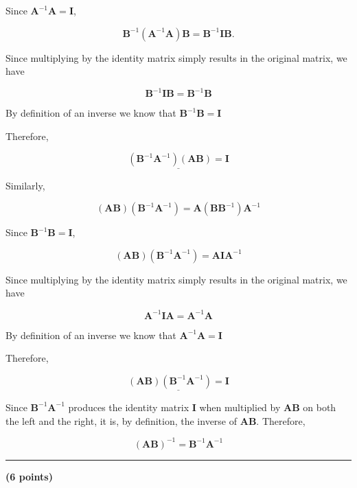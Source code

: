 \documentclass[12pt]{article}
\begin{document}
\begin{enumerate}
\noindent Since $\mathbf{A}^{-1}\mathbf{A} = \mathbf{I}$,

$$
\mathbf{B}^{-1}(\mathbf{A}^{-1}\mathbf{A})\mathbf{B}
=
\mathbf{B}^{-1}\mathbf{I}\mathbf{B}.
$$

\noindent Since multiplying by the identity matrix simply results in the original matrix, we have

$$
\mathbf{B}^{-1}\mathbf{I}\mathbf{B}
=
\mathbf{B}^{-1}\mathbf{B}
$$

By definition of an inverse we know that $\mathbf{B}^{-1}\mathbf{B} = \mathbf{I}$ 

\noindent Therefore,

$$
\underline{
(\mathbf{B}^{-1}\mathbf{A}^{-1})(\mathbf{A}\mathbf{B})=\mathbf{I}
}
$$

\noindent Similarly,

$$
(\mathbf{A}\mathbf{B})(\mathbf{B}^{-1}\mathbf{A}^{-1})
=
\mathbf{A}(\mathbf{B}\mathbf{B}^{-1})\mathbf{A}^{-1}
$$

\noindent Since $\mathbf{B}^{-1}\mathbf{B} = \mathbf{I}$,

$$
(\mathbf{A}\mathbf{B})(\mathbf{B}^{-1}\mathbf{A}^{-1})
=
\mathbf{A}\mathbf{I}\mathbf{A}^{-1}
$$

\noindent Since multiplying by the identity matrix simply results in the original matrix, we have

$$
\mathbf{A}^{-1}\mathbf{I}\mathbf{A}
=
\mathbf{A}^{-1}\mathbf{A}
$$

By definition of an inverse we know that $\mathbf{A}^{-1}\mathbf{A} = \mathbf{I}$ 

\noindent Therefore,

$$
\underline{
(\mathbf{A}\mathbf{B})(\mathbf{B}^{-1}\mathbf{A}^{-1})=\mathbf{I}
}
$$

\noindent Since $\mathbf{B}^{-1}\mathbf{A}^{-1}$ produces the identity matrix $\mathbf{I}$ when multiplied by $\mathbf{A}\mathbf{B}$ on both the left and the right, it is, by definition, the inverse of $\mathbf{A}\mathbf{B}$. Therefore,

$$
\boxed{
(\mathbf{A}\mathbf{B})^{-1}=\mathbf{B}^{-1}\mathbf{A}^{-1}
}
$$

\end{enumerate}

\vspace{2em}

\noindent\rule{\textwidth}{0.4pt}

\vspace{2em}

 \hfill {\large \textbf{(6 points)}}
\end{document}
